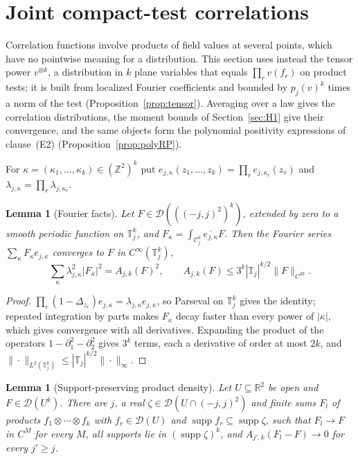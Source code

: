 \documentclass[11pt]{article}
\theoremstyle{plain}
\newtheorem{lemma}[theorem]{Lemma}
\theoremstyle{definition}
\theoremstyle{remark}
\newcommand{\R}{\mathbb{R}}
\newcommand{\Z}{\mathbb{Z}}
\newcommand{\T}{\mathbb{T}}
\newcommand{\cC}{\mathcal{C}}
\newcommand{\cD}{\mathcal{D}}
\newcommand{\conj}[1]{\overline{#1}}
\DeclareMathOperator{\supp}{supp}
\begin{document}
\section{Joint compact-test correlations}\label{sec:K1}

Correlation functions involve products of field values at several points, which have no pointwise meaning for a distribution. This section uses instead the tensor power $v^{\otimes k}$, a distribution in $k$ plane variables that equals $\prod_rv(f_r)$ on product tests; it is built from localized Fourier coefficients and bounded by $p_j(v)^{k}$ times a norm of the test (Proposition~\ref{prop:tensor}). Averaging over a law gives the correlation distributions, the moment bounds of Section~\ref{sec:H1} give their convergence, and the same objects form the polynomial positivity expressions of clause~(E2) (Proposition~\ref{prop:polyRP}).

For $\kappa=(\kappa_1,\dots,\kappa_k)\in(\Z^{2})^{k}$ put
$e_{j,\kappa}(z_1,\dots,z_k)=\prod_re_{j,\kappa_r}(z_r)$ and $\lambda_{j,\kappa}=\prod_r\lambda_{j,\kappa_r}$.

\begin{lemma}[Fourier facts]\label{lem:fourier}
Let $F\in\cD(((-j,j)^{2})^{k})$, extended by zero to a smooth periodic function on
$\T_j^{k}$, and $F_\kappa=\int_{\cC_j^{k}}\conj{e_{j,\kappa}}F$. Then the Fourier series
$\sum_\kappa F_\kappa e_{j,\kappa}$ converges to $F$ in $C^{\infty}(\T_j^{k})$,
\begin{equation}\label{eq:coeffnorm}
\sum_\kappa\lambda_{j,\kappa}^{2}|F_\kappa|^{2}=A_{j,k}(F)^{2},\qquad
A_{j,k}(F)\le3^{k}|\T_j|^{k/2}\|F\|_{C^{2k}} .
\end{equation}
\end{lemma}

\begin{proof}
$\prod_r(1-\Delta_{z_r})e_{j,\kappa}=\lambda_{j,\kappa}e_{j,\kappa}$, so Parseval on $\T_j^{k}$ gives the
identity; repeated integration by parts makes $F_\kappa$ decay faster than every power
of $|\kappa|$, which gives convergence with all derivatives. Expanding the product
of the operators $1-\partial_1^{2}-\partial_2^{2}$ gives $3^{k}$ terms, each a derivative of order at
most $2k$, and $\|\cdot\|_{L^{2}(\T_j^{k})}\le|\T_j|^{k/2}\|\cdot\|_\infty$.
\end{proof}

\begin{lemma}[Support-preserving product density]\label{lem:density}
Let $U\subseteq\R^{2}$ be open and $F\in\cD(U^{k})$. There are $j$, a real $\zeta\in\cD(U\cap(-j,j)^{2})$
and finite sums $F_l$ of products $f_1\otimes\cdots\otimes f_k$ with $f_r\in\cD(U)$ and
$\supp f_r\subseteq\supp\zeta$, such that $F_l\to F$ in $C^{M}$ for every $M$, all supports lie in
$(\supp\zeta)^{k}$, and $A_{j',k}(F_l-F)\to0$ for every $j'\ge j$.
\end{lemma}
\end{document}
